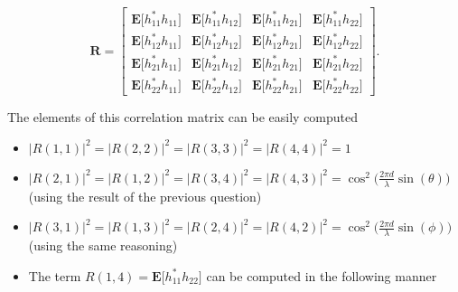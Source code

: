 \documentclass [a4paper, 11pt] {article}
\begin{document}
\begin{solution}
\begin{enumerate}
    \begin{equation}
       \mathbf{R} = \begin{bmatrix}
        \mathbf{E}\big[h^*_{11}h_{11} \big] & \mathbf{E}\big[h^*_{11}h_{12} \big] & \mathbf{E}\big[h^*_{11}h_{21} \big] & \mathbf{E}\big[h^*_{11}h_{22} \big]\\
        \mathbf{E}\big[h^*_{12}h_{11} \big] & \mathbf{E}\big[h^*_{12}h_{12} \big] & \mathbf{E}\big[h^*_{12}h_{21} \big] & \mathbf{E}\big[h^*_{12}h_{22} \big]\\
        \mathbf{E}\big[h^*_{21}h_{11} \big] & \mathbf{E}\big[h^*_{21}h_{12} \big] & \mathbf{E}\big[h^*_{21}h_{21} \big] & \mathbf{E}\big[h^*_{21}h_{22} \big]\\
        \mathbf{E}\big[h^*_{22}h_{11} \big] & \mathbf{E}\big[h^*_{22}h_{12} \big] & \mathbf{E}\big[h^*_{22}h_{21} \big] & \mathbf{E}\big[h^*_{22}h_{22} \big]
        \end{bmatrix}.
    \end{equation}

    The elements of this correlation matrix can be easily computed

    \begin{itemize}
        \item $|R(1,1)|^2 = |R(2,2)|^2 = |R(3,3)|^2 = |R(4,4)|^2 = 1$
        \item $|R(2,1)|^2 = |R(1,2)|^2 = |R(3,4)|^2 = |R(4,3)|^2 = \cos^2 \Big( \frac{2 \pi d}{\lambda} \sin (\theta) \Big)$ (using the result of the previous question)
        \item $|R(3,1)|^2 = |R(1,3)|^2 = |R(2,4)|^2 = |R(4,2)|^2 = \cos^2 \Big( \frac{2 \pi d}{\lambda} \sin (\phi) \Big)$ (using the same reasoning)
        \item The term $R(1,4) = \mathbf{E}\big[h^*_{11}h_{22}\big]$ can be computed in the following manner


\end{itemize}
\end{enumerate}
\end{solution}
\end{document}
